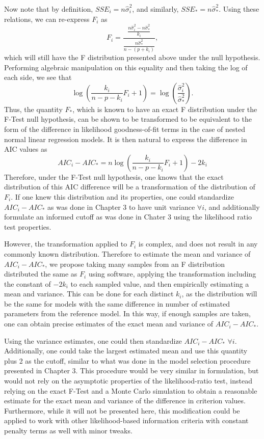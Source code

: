 Now note that by definition, $SSE_i = n \hat{\sigma}^2_i$, and similarly, $SSE_* = n \hat{\sigma}^2_*$. Using these relations, we can re-express
$F_i$ as
\begin{equation}
	F_i = \frac{\frac{n \hat{\sigma}^2_i - n \hat{\sigma}^2_*}{k_i}}{\frac{n \hat{\sigma}^2_*}{n-(p+k_i)}} ,
\end{equation}
which will still have the F distribution presented above under the null hypothesis. Performing algebraic manipulation on this equality and
then taking the log of each side, we see that
\begin{equation}
	\log( \frac{k_i}{n-p-k_i} F_i + 1 ) = \log(\frac{\hat{\sigma}^2_i}{\hat{\sigma}^2_*}) .
\end{equation}
Thus, the quantity $F_*$, which is known to have an exact F distribution under the F-Test null hypothesis, can be shown to be transformed to
be equivalent to the form of the difference in likelihood goodness-of-fit terms in the case of nested normal linear regression models.
It is then natural to express the difference in AIC values as
\begin{equation}
	AIC_i - AIC_* = n \log( \frac{k_i}{n-p-k_i} F_i + 1 ) - 2k_i
\end{equation}
Therefore, under the F-Test null hypothesis, one knows that the exact distribution of this AIC difference will be a transformation of the
distribution of $F_i$. If one knew this distribution and its properties, one could standardize $AIC_i - AIC_*$ as was done in Chapter 3
to have unit variance $\forall i$, and additionally formulate an informed cutoff as was done in Chater 3 using the likelihood ratio
test properties.

However, the transformation applied to $F_i$ is complex, and does not result in any commonly known distribution. Therefore to estimate
the mean and variance of $AIC_i - AIC_*$, we propose taking many samples from an F distribution distributed the same as $F_i$
using software, applying the transformation including the constant of $-2k_i$ to each sampled value, and then empirically estimating
a mean and variance. This can be done for each distinct $k_i$, as the distribution will be the same for models with the same difference
in number of estimated parameters from the reference model. In this way, if enough samples are taken, one can obtain precise estimates
of the exact mean and variance of $AIC_i - AIC_*$.

Using the variance estimates, one could then standardize $AIC_i - AIC_*$ $\forall i$. Additionally, one could take the largest estimated
mean and use this quantity plus 2 as the cutoff, similar to what was done in the model selection procedure presented in Chapter 3. This
procedure would be very similar in formulation, but would not rely on the asymptotic properties of the likelihood-ratio test, instead
relying on the exact F-Test and a Monte Carlo simulation to obtain a reasonable estimate for the exact mean and variance of the difference
in criterion values. Furthermore, while it will not be presented here, this modification could be applied to work with other likelihood-based
information criteria with constant penalty terms as well with minor tweaks.

